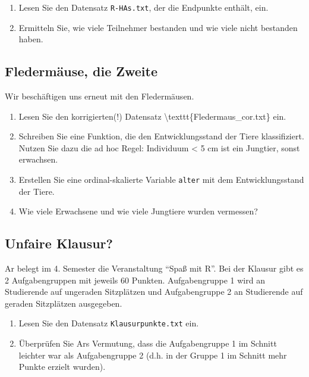 \documentclass[]{book}
\providecommand{\tightlist}{%
  \setlength{\itemsep}{0pt}\setlength{\parskip}{0pt}}
\begin{document}
\begin{enumerate}
\def\labelenumi{\arabic{enumi}.}
\tightlist
\item
  Lesen Sie den Datensatz \texttt{R-HAs.txt}, der die Endpunkte enthält, ein.
\item
  Ermitteln Sie, wie viele Teilnehmer bestanden und wie viele nicht bestanden haben.
\end{enumerate}

\hypertarget{fledermaus}{%
\subsection{Fledermäuse, die Zweite}\label{fledermaus}}

Wir beschäftigen uns erneut mit den Fledermäusen.

\begin{enumerate}
\def\labelenumi{\arabic{enumi}.}
\tightlist
\item
  Lesen Sie den korrigierten(!) Datensatz \textbackslash{}texttt\{Fledermaus\_cor.txt\} ein.
\item
  Schreiben Sie eine Funktion, die den Entwicklungsstand der Tiere klassifiziert. Nutzen Sie dazu die ad hoc Regel: Individuum \textless{} 5 cm ist ein Jungtier, sonst erwachsen.
\item
  Erstellen Sie eine ordinal-skalierte Variable \texttt{alter} mit dem Entwicklungsstand der Tiere.
\item
  Wie viele Erwachsene und wie viele Jungtiere wurden vermessen?
\end{enumerate}

\hypertarget{unfaire-klausur}{%
\subsection{Unfaire Klausur?}\label{unfaire-klausur}}

Ar belegt im 4. Semester die Veranstaltung ``Spaß mit R''. Bei der Klausur gibt es 2 Aufgabengruppen mit jeweils 60 Punkten. Aufgabengruppe 1 wird an Studierende auf ungeraden Sitzplätzen und Aufgabengruppe 2 an Studierende auf geraden Sitzplätzen ausgegeben.

\begin{enumerate}
\def\labelenumi{\arabic{enumi}.}
\tightlist
\item
  Lesen Sie den Datensatz \texttt{Klausurpunkte.txt} ein.
\item
  Überprüfen Sie Ars Vermutung, dass die Aufgabengruppe 1 im Schnitt leichter war als Aufgabengruppe 2 (d.h. in der Gruppe 1 im Schnitt mehr Punkte erzielt wurden).
\end{enumerate}
\end{document}
